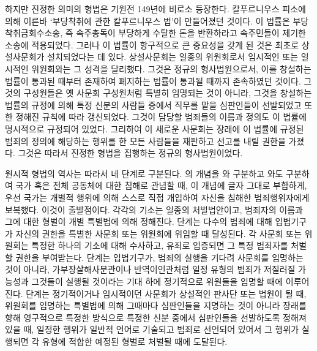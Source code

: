 하지만 진정한 의미의 형법은 기원전 149년에 비로소 등장한다.
칼푸르니우스 피소에 의해
이른바
`부당착취에 관한 칼푸르니우스 법'이
만들어졌던 것이다.
이 법률은 부당착취금회수소송,
즉 속주총독이 부당하게 수탈한 돈을 반환하라고 속주민들이 제기한
소송에 적용되었다.
그러나 이 법률이 항구적으로 큰 중요성을 갖게 된 것은
최초로 상설사문회가 설치되었다는 데 있다.
상설사문회는 일종의 위원회로서
임시적인 또는 일시적인 위원회와는 그 성격을 달리했다.
그것은 정규의 형사법원으로서,
이를 창설하는 법률이 통과된 때부터 존재하여
폐지하는 법률이 통과될 때까지 존속하였던 것이다.
그것의 구성원들은
옛 사문회 구성원처럼 특별히 임명되는 것이 아니라,
그것을 창설하는 법률의 규정에 의해
특정 신분의 사람들 중에서 직무를 맡을 심판인들이 선발되었고
또한 정해진 규칙에 따라 갱신되었다.
그것이 담당할 범죄들의 이름과 정의도
이 법률에
명시적으로 규정되어 있었다.
그리하여 이 새로운 사문회는
장래에
이 법률에 규정된 범죄의 정의에 해당하는 행위를 한
모든 사람들을 재판하고 선고를 내릴 권한을 가졌다.
그것은 따라서
진정한 형법을 집행하는
정규의 형사법원이었다.

원시적 형법의 역사는 따라서 네 단계로 구분된다.
의 개념을
와 구분하고
와도 구분하여
국가 혹은 전체 공동체에 대한 침해로 관념할 때,
이 개념에 글자 그대로 부합하게,
우선
국가는
개별적 행위에 의해 스스로 직접 개입하여
자신을 침해한 범죄행위자에게 보복했다.
이것이 출발점이다.
각각의 기소는 일종의 처벌법안이고,
범죄자의 이름과 그에 대한 형벌이 개별 특별법에 의해 정해진다.
 단계는
다수의 범죄에 대해
입법기구가 자신의 권한을 특별한 사문회 또는 위원회에 위임할 때
달성된다.
각 사문회 또는 위원회는
특정한 하나의 기소에 대해 수사하고,
유죄로 입증되면 그 특정 범죄자를 처벌할 권한을 부여받는다.
 단계는
입법기구가,
범죄의 실행을 기다려
사문회를 임명하는 것이 아니라,
가부장살해사문관이나 반역이인관처럼
일정 유형의 범죄가 저질러질 가능성과
 그것들이 실행될 것이라는 기대 하에
정기적으로 위원들을 임명할 때에 이루어진다.
 단계는
정기적이거나 임시적이던 사문회가
상설적인 판사단 또는 법원이 될 때,
위원회를 임명하는 특별법에 의해 그때마다
심판인들을
지명하는 것이 아니라
장래를 향해 영구적으로
특정한 방식으로 특정한 신분 중에서
심판인들을
선발하도록 정해져있을 때,
일정한 행위가 일반적 언어로 기술되고 범죄로 선언되어 있어서
그 행위가 실행되면 각 유형에 적합한 예정된 형벌로 처벌될 때에
도달된다.

